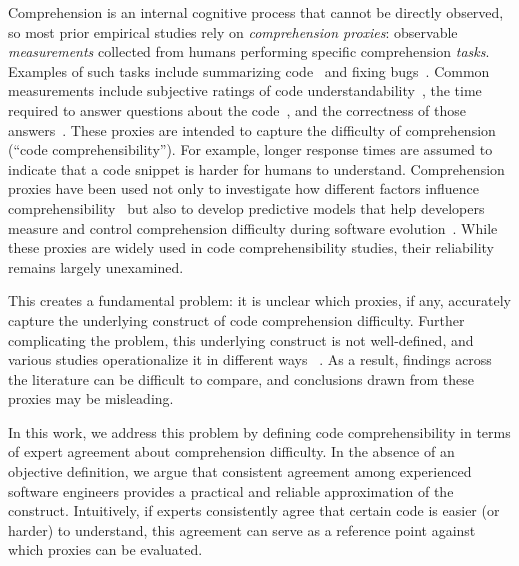 Comprehension is an internal cognitive process that cannot be directly observed, so most prior empirical studies rely on \emph{comprehension proxies}:
observable \textit{measurements} collected from humans performing specific comprehension \textit{tasks}. Examples of such tasks include summarizing code~\cite{S4, S11, S24, S35, 33-7, 33-8, S38, S42, S49} and fixing bugs~\cite{S38, S55, S64, S87}. Common measurements include subjective ratings of code understandability~\cite{S4, S34, 33-7, S42, S49, 33-20}, the time required to answer questions about the code~\cite{Scalabrino:TSE19, S11, S39, S48, S50, S57, S59, S60, 33-24}, and the correctness of those answers~\cite{Scalabrino:TSE19, S11, NovicesVSprof1:BIBE2016, S48, S50, S57, S59, S60, 33-24}.
These proxies are intended to capture the difficulty of comprehension (\ie ``code comprehensibility'').
For example, longer response times are assumed to indicate that a code snippet is harder for humans to understand.
Comprehension proxies have been used not only to investigate how different factors influence comprehensibility~\cite{S4,S49,Peitek:TSE18,Siegmund:ICSE14,Stapleton:ICPC2020,Wyrich:ACS23} but also to develop predictive models that help developers measure and control comprehension difficulty during software evolution~\cite{Scalabrino:TSE19,Raymond:TSE10,Lavazza:ESE2023, De:2025}.
While these proxies are widely used in code comprehensibility studies, their reliability remains largely unexamined.

This creates a fundamental problem: it is unclear which proxies, if any, accurately capture the underlying construct of code comprehension difficulty.
Further complicating the problem, this underlying construct is not well-defined, and various studies operationalize it in different ways ~\cite{Wyrich:ACS23}. As a result, findings across the literature can be difficult to compare, and conclusions drawn from these proxies may be misleading.

In this work, we address this problem by defining code comprehensibility in terms of expert agreement about comprehension difficulty. In the absence of an objective definition, we argue that consistent agreement among experienced software engineers provides a practical and reliable approximation of the construct. Intuitively, if experts consistently agree that certain code is easier (or harder) to understand, this agreement can serve as a reference point against which proxies can be evaluated.

